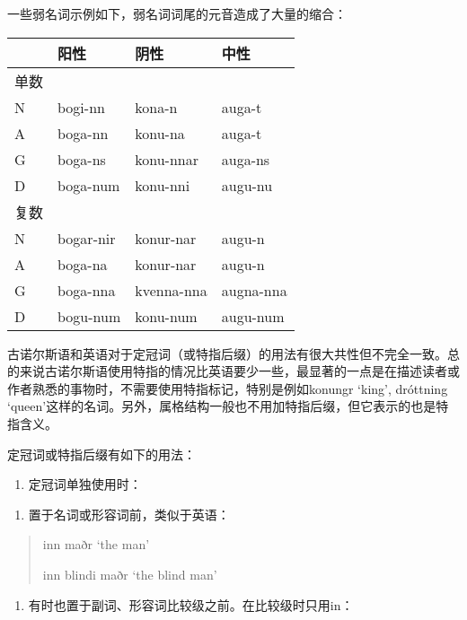 一些弱名词示例如下，弱名词词尾的元音造成了大量的缩合：

\begin{longtable}{llll}
  \toprule
     & 阳性        & 阴性         & 中性        \\
  \midrule
  \endhead
  \bottomrule
  \endfoot
  单数 &           &            &           \\
  N  & bogi-nn   & kona-n     & auga-t    \\
  A  & boga-nn   & konu-na    & auga-t    \\
  G  & boga-ns   & konu-nnar  & auga-ns   \\
  D  & boga-num  & konu-nni   & augu-nu   \\
  复数 &           &            &           \\
  N  & bogar-nir & konur-nar  & augu-n    \\
  A  & boga-na   & konur-nar  & augu-n    \\
  G  & boga-nna  & kvenna-nna & augna-nna \\
  D  & bogu-num  & konu-num   & augu-num  \\
\end{longtable}

古诺尔斯语和英语对于定冠词（或特指后缀）的用法有很大共性但不完全一致。总的来说古诺尔斯语使用特指的情况比英语要少一些，最显著的一点是在描述读者或作者熟悉的事物时，不需要使用特指标记，特别是例如konungr
`king', dróttning
`queen'这样的名词。另外，属格结构一般也不用加特指后缀，但它表示的也是特指含义。

定冠词或特指后缀有如下的用法：

\begin{enumerate}
  \def\labelenumi{\Alph{enumi}.}
  \item
        定冠词单独使用时：
\end{enumerate}

\begin{enumerate}
  \def\labelenumi{\arabic{enumi})}
  \item
        置于名词或形容词前，类似于英语：
\end{enumerate}

\begin{quote}
  inn maðr `the man'

  inn blindi maðr `the blind man'
\end{quote}

\begin{enumerate}
  \def\labelenumi{\arabic{enumi})}
  \setcounter{enumi}{1}
  \item
        有时也置于副词、形容词比较级之前。在比较级时只用in：
\end{enumerate}

